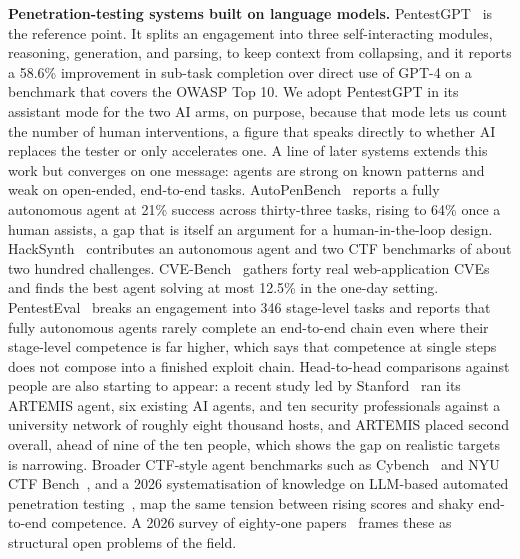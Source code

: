 \documentclass[conference]{IEEEtran}
\begin{document}
\textbf{Penetration-testing systems built on language models.}
PentestGPT~\cite{deng2024} is the reference point. It splits an engagement into three self-interacting modules, reasoning, generation, and parsing, to keep context from collapsing, and it reports a 58.6\% improvement in sub-task completion over direct use of GPT-4 on a benchmark that covers the OWASP Top 10. We adopt PentestGPT in its assistant mode for the two AI arms, on purpose, because that mode lets us count the number of human interventions, a figure that speaks directly to whether AI replaces the tester or only accelerates one. A line of later systems extends this work but converges on one message: agents are strong on known patterns and weak on open-ended, end-to-end tasks. AutoPenBench~\cite{gioacchini2025} reports a fully autonomous agent at 21\% success across thirty-three tasks, rising to 64\% once a human assists, a gap that is itself an argument for a human-in-the-loop design. HackSynth~\cite{muzsai2024} contributes an autonomous agent and two CTF benchmarks of about two hundred challenges. CVE-Bench~\cite{zhu2025} gathers forty real web-application CVEs and finds the best agent solving at most 12.5\% in the one-day setting. PentestEval~\cite{yang2025} breaks an engagement into 346 stage-level tasks and reports that fully autonomous agents rarely complete an end-to-end chain even where their stage-level competence is far higher, which says that competence at single steps does not compose into a finished exploit chain. Head-to-head comparisons against people are also starting to appear: a recent study led by Stanford~\cite{artemis2026} ran its ARTEMIS agent, six existing AI agents, and ten security professionals against a university network of roughly eight thousand hosts, and ARTEMIS placed second overall, ahead of nine of the ten people, which shows the gap on realistic targets is narrowing. Broader CTF-style agent benchmarks such as Cybench~\cite{cybench2025} and NYU CTF Bench~\cite{nyuctf2024}, and a 2026 systematisation of knowledge on LLM-based automated penetration testing~\cite{sok2026}, map the same tension between rising scores and shaky end-to-end competence. A 2026 survey of eighty-one papers~\cite{he2026} frames these as structural open problems of the field.
\end{document}
